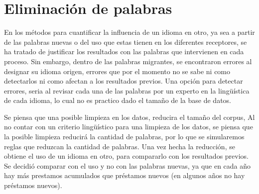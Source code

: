\chapter{Eliminación de palabras}

En los métodos para cuantificar la influencia de un idioma en otro, ya sea a
partir de las palabras nuevas o del uso que estas tienen en los diferentes
receptores, se ha tratado de justificar los resultados con las palabras que
intervienen en cada proceso. Sin embargo, dentro de las palabras migrantes, se
encontraron errores al designar su idioma origen, errores que por el momento no
se sabe ni como detectarlos ni como afectan a los resultados previos.  Una
opción para detectar errores, seria al revisar cada una de las palabras por un
experto en la lingüística de cada idioma, lo cual no es practico dado el tamaño
de la base de datos.

Se piensa que una posible limpieza en los datos, reducira el tamaño del corpus, 
Al no contar con un criterio lingüístico para una limpieza de los datos, se
piensa que la posible limpieza reducirá la cantidad de palabras, por lo que se
simularemos reglas  que reduzcan la cantidad de palabras.  Una vez hecha la
reducción, se obtiene el uso de un idioma en otro, para compararlo con los
resultados previos. Se decidió comparar con el uso y no con las palabras
nuevas, ya que en cada año hay más prestamos acumulados que préstamos nuevos
(en algunos años no hay préstamos nuevos).
 


